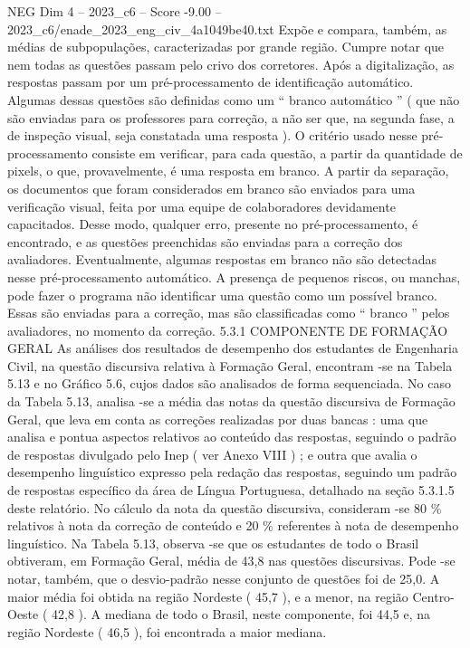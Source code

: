 \begin{textsample}{NEG Dim 4 – 2023\_c6 – Score -9.00 – 2023\_c6/enade\_2023\_eng\_civ\_4a1049be40.txt}
Expõe e compara, também, as médias de subpopulações, caracterizadas por grande região.
Cumpre notar que nem todas as questões passam pelo crivo dos corretores.
Após a digitalização, as respostas passam por um pré-processamento de identificação automático.
Algumas dessas questões são definidas como um “ branco automático ” ( que não são enviadas para os professores para correção, a não ser que, na segunda fase, a de inspeção visual, seja constatada uma resposta ).
O critério usado nesse pré-processamento consiste em verificar, para cada questão, a partir da quantidade de pixels, o que, provavelmente, é uma resposta em branco.
A partir da separação, os documentos que foram considerados em branco são enviados para uma verificação visual, feita por uma equipe de colaboradores devidamente capacitados.
Desse modo, qualquer erro, presente no pré-processamento, é encontrado, e as questões preenchidas são enviadas para a correção dos avaliadores.
Eventualmente, algumas respostas em branco não são detectadas nesse pré-processamento automático.
A presença de pequenos riscos, ou manchas, pode fazer o programa não identificar uma questão como um possível branco.
Essas são enviadas para a correção, mas são classificadas como “ branco ” pelos avaliadores, no momento da correção. 5.3.1 COMPONENTE DE FORMAÇÃO GERAL As análises dos resultados de desempenho dos estudantes de Engenharia Civil, na questão discursiva relativa à Formação Geral, encontram -se na Tabela 5.13 e no Gráfico 5.6, cujos dados são analisados de forma sequenciada.
No caso da Tabela 5.13, analisa -se a média das notas da questão discursiva de Formação Geral, que leva em conta as correções realizadas por duas bancas : uma que analisa e pontua aspectos relativos ao conteúdo das respostas, seguindo o padrão de respostas divulgado pelo Inep ( ver Anexo VIII ) ; e outra que avalia o desempenho linguístico expresso pela redação das respostas, seguindo um padrão de respostas específico da área de Língua Portuguesa, detalhado na seção 5.3.1.5 deste relatório.
No cálculo da nota da questão discursiva, consideram -se 80 \% relativos à nota da correção de conteúdo e 20 \% referentes à nota de desempenho linguístico.
Na Tabela 5.13, observa -se que os estudantes de todo o Brasil obtiveram, em Formação Geral, média de 43,8 nas questões discursivas.
Pode -se notar, também, que o desvio-padrão nesse conjunto de questões foi de 25,0.
A maior média foi obtida na região Nordeste ( 45,7 ), e a menor, na região Centro-Oeste ( 42,8 ).
A mediana de todo o Brasil, neste componente, foi 44,5 e, na região Nordeste ( 46,5 ), foi encontrada a maior mediana.

\end{textsample}
